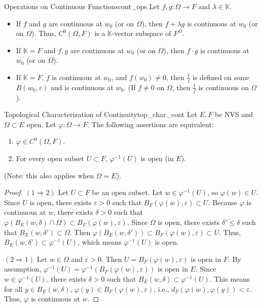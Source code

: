 \documentclass[11pt, a4paper]{article}
\newcommand{\eps}{\varepsilon}
\begin{document}
\begin{proposition}{Operations on Continuous Functions}{cont_ops}
Let $f, g: \Omega \to F$ and $\lambda \in \mathbb{K}$.
\begin{itemize}
    \item If $f$ and $g$ are continuous at $w_0$ (or on $\Omega$), then $f + \lambda g$ is continuous at $w_0$ (or on $\Omega$). Thus, $C^0(\Omega, F)$ is a $\mathbb{K}$-vector subspace of $F^\Omega$.
    \item If $\mathbb{K} = F$ and $f, g$ are continuous at $w_0$ (or on $\Omega$), then $f \cdot g$ is continuous at $w_0$ (or on $\Omega$).
    \item If $\mathbb{K} = F$, $f$ is continuous at $w_0$, and $f(w_0) \neq 0$, then $\frac{1}{f}$ is defined on some $B(w_0, \eps)$ and is continuous at $w_0$. (If $f \neq 0$ on $\Omega$, then $\frac{1}{f}$ is continuous on $\Omega$).
\end{itemize}
\end{proposition}

\begin{proposition}{Topological Characterization of Continuity}{top_char_cont}
Let $E, F$ be NVS and $\Omega \subset E$ open. Let $\varphi: \Omega \to F$. The following assertions are equivalent:
\begin{enumerate}
    \item $\varphi \in C^0(\Omega, F)$.
    \item For every open subset $U \subset F$, $\varphi^{-1}(U)$ is open (in $E$).
\end{enumerate}
(Note: this also applies when $\Omega = E$).
\end{proposition}
\begin{proof}
$(1 \Rightarrow 2)$ Let $U \subset F$ be an open subset. Let $w \in \varphi^{-1}(U)$, so $\varphi(w) \in U$.
Since $U$ is open, there exists $\eps > 0$ such that $B_F(\varphi(w), \eps) \subset U$.
Because $\varphi$ is continuous at $w$, there exists $\delta > 0$ such that $\varphi(B_E(w, \delta) \cap \Omega) \subset B_F(\varphi(w), \eps)$.
Since $\Omega$ is open, there exists $\delta' \le \delta$ such that $B_E(w, \delta') \subset \Omega$.
Then $\varphi(B_E(w, \delta')) \subset B_F(\varphi(w), \eps) \subset U$.
Thus, $B_E(w, \delta') \subset \varphi^{-1}(U)$, which means $\varphi^{-1}(U)$ is open.

$(2 \Rightarrow 1)$ Let $w \in \Omega$ and $\eps > 0$. Then $U = B_F(\varphi(w), \eps)$ is open in $F$.
By assumption, $\varphi^{-1}(U) = \varphi^{-1}(B_F(\varphi(w), \eps))$ is open in $E$.
Since $w \in \varphi^{-1}(U)$, there exists $\delta > 0$ such that $B_E(w, \delta) \subset \varphi^{-1}(U)$.
This means for all $y \in B_E(w, \delta)$, $\varphi(y) \in B_F(\varphi(w), \eps)$, i.e., $d_F(\varphi(w), \varphi(y)) < \eps$. Thus, $\varphi$ is continuous at $w$.
\end{proof}
\end{document}
